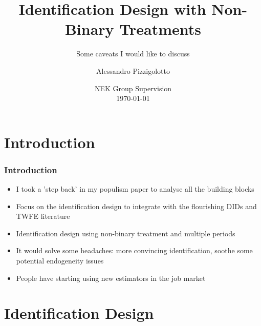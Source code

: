 \documentclass{beamer}
\title{Identification Design with Non-Binary Treatments}
\subtitle{Some caveats I would like to discuss}
\author{Alessandro Pizzigolotto}
\date{
NEK Group Supervision\\
\today}
\begin{document}
\frame{\titlepage}


\section{Introduction}

\begin{frame}\frametitle{Introduction}
    
    \begin{itemize}
        \item I took a 'step back' in my populism paper to analyse all the building blocks
        \item Focus on the identification design to integrate with the flourishing DIDs and TWFE literature
        \item Identification design using non-binary treatment and multiple periods 
    \end{itemize}

    \vspace{0.2em}

    \begin{itemize}
        \item It would solve some headaches: more convincing identification, soothe some potential endogeneity issues
        \item People have starting using new estimators in the job market \citep[\textit{e.g}][]{bib:becker2021}
    \end{itemize}


\end{frame}


\section{Identification Design}
\end{document}
